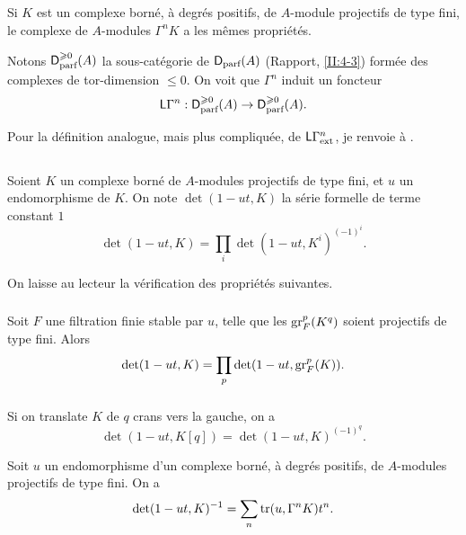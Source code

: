 \subsection{}\label{III:1-6}

Si $K$ est un complexe borné, à degrés positifs, de $A$-module projectifs 
de type fini, le complexe de $A$-modules $\Gamma^n K$ a les mêmes 
propriétés. 

Notons $\mathsf{D}_\text{parf}^{\geqslant 0}(A)$ la sous-catégorie de 
$\mathsf{D}_\text{parf}(A)$ (Rapport, \ref{II:4-3}) formée des complexes de 
tor-dimension $\leqslant 0$. On voit que $\Gamma^n$ induit un foncteur 
\[
  \mathsf{L}\Gamma^n : \mathsf{D}_\text{parf}^{\geqslant 0}(A) \to \mathsf{D}_\text{parf}^{\geqslant 0}(A) \text{.}
\]

Pour la définition analogue, mais plus compliquée, de 
$\mathsf{L}\Gamma_\text{ext}^n$, je renvoie à \cite[XVII 5.5.14]{sga4}. 





\subsection{}\label{III:1-7}

Soient $K$ un complexe borné de $A$-modules projectifs de type fini, et $u$ 
un endomorphisme de $K$. On note $\det(1-u t,K)$ la série formelle de terme 
constant $1$ 
\[
  \det(1-u t,K) = \prod_i \det(1-u t,K^i)^{(-1)^i} \text{.}
\]

On laisse au lecteur la vérification des propriétés suivantes. 


\subsubsection{}\label{III:1-7-1}

Soit $F$ une filtration finie stable par $u$, telle que les $\operatorname{gr}_F^p(K^q)$ 
soient projectifs de type fini. Alors 
\[
  \det(1-u t,K) = \prod_p \det(1-u t,\operatorname{gr}_F^p(K)) \text{.}
\]


\subsubsection{}\label{III:1-7-2}

Si on translate $K$ de $q$ crans vers la gauche, on a 
\[
  \det(1-u t,K[q]) = \det(1-u t,K)^{(-1)^q} \text{.}
\]





\begin{proposition_}\label{III:1-8}
Soit $u$ un endomorphisme d'un complexe borné, à degrés positifs, de 
$A$-modules projectifs de type fini. On a \
\begin{equation}\label{III:eq:1-8-1}
  \det(1-u t,K)^{-1} = \sum_n \operatorname{tr}(u,\Gamma^n K) t^n \text{.}
\end{equation}
\end{proposition_}

